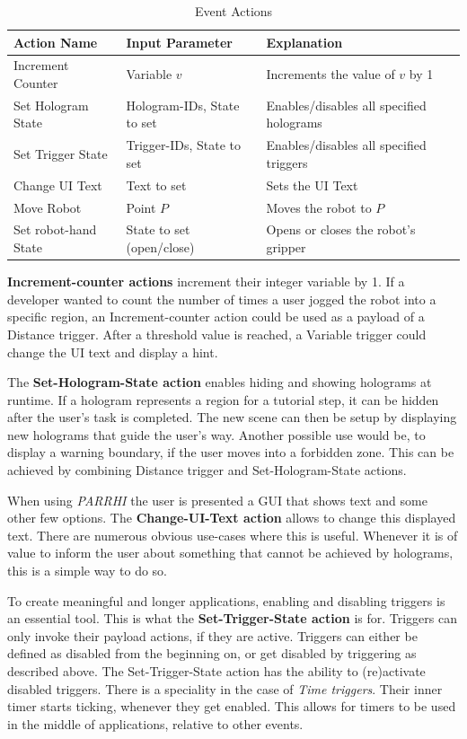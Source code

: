 \begin{table}
	\caption{Event Actions}
	\label{Table:Actions}
	\centering
	\begin{tabular}{lll}
		\toprule
		Action Name & Input Parameter		& Explanation	\\		
		\midrule
		Increment Counter  	& Variable $v$					& Increments the value of $v$ by 1 \\
		Set Hologram State 	& Hologram-IDs, State to set	& Enables/disables all specified holograms \\
		Set Trigger State  	& Trigger-IDs, State to set    	& Enables/disables all specified triggers \\
		Change UI Text	  	& Text to set					& Sets the UI Text\\
		Move Robot			& Point $P$						& Moves the robot to $P$ \\
		Set robot-hand State & State to set (open/close)		& Opens or closes the robot's gripper \\
		\bottomrule
	\end{tabular}
\end{table}

\textbf{Increment-counter actions} increment their integer variable by 1. If a developer wanted to count the number of times a user jogged the robot into a specific region, an Increment-counter action could be used as a payload of a Distance trigger. After a threshold value is reached, a Variable trigger could change the UI text and display a hint.

The \textbf{Set-Hologram-State action} enables hiding and showing holograms at runtime. If a hologram represents a region for a tutorial step, it can be hidden after the user's task is completed. The new scene can then be setup by displaying new holograms that guide the user's way. Another possible use would be, to display a warning boundary, if the user moves into a forbidden zone. This can be achieved by combining Distance trigger and Set-Hologram-State actions.

When using \textit{PARRHI} the user is presented a GUI that shows text and some other few options. The \textbf{Change-UI-Text action} allows to change this displayed text. There are numerous obvious use-cases where this is useful. Whenever it is of value to inform the user about something that cannot be achieved by holograms, this is a simple way to do so.

To create meaningful and longer applications, enabling and disabling triggers is an essential tool. This is what the \textbf{Set-Trigger-State action} is for. Triggers can only invoke their payload actions, if they are active. Triggers can either be defined as disabled from the beginning on, or get disabled by triggering as described above. The Set-Trigger-State action has the ability to (re)activate disabled triggers. There is a speciality in the case of \textit{Time triggers}. Their inner timer starts ticking, whenever they get enabled. This allows for timers to be used in the middle of applications, relative to other events.

